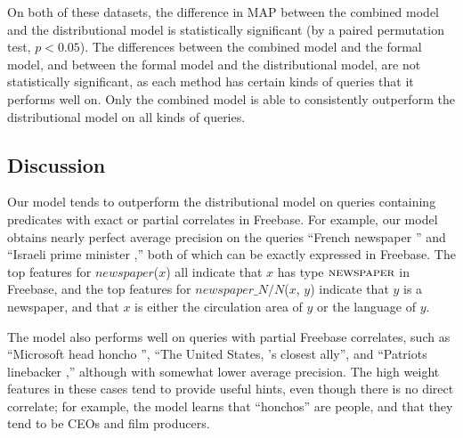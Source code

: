 \documentclass[11pt,letterpaper]{article}
\newcommand{\blank}{\underline{\hspace{.5cm}}}
\newcommand{\lexicalpredicate}[1]{\ensuremath{\textit{#1}}}
\newcommand{\formalpredicate}[1]{{\small \ensuremath{\textsc{#1}}}}
\begin{document}
On both of these datasets, the difference in MAP between the combined model and the distributional
model is statistically significant (by a paired permutation test, $p < 0.05$).  The differences
between the combined model and the formal model, and between the formal model and the
distributional model, are not statistically significant, as each method has certain kinds of
queries that it performs well on.  Only the combined model is able to consistently outperform the
distributional model on all kinds of queries.

\subsection{Discussion}

Our model tends to outperform the distributional model on queries containing predicates with exact
or partial correlates in Freebase. For example, our model obtains nearly perfect average precision
on the queries ``French newspaper \blank{}'' and ``Israeli prime minister \blank{},'' both of which
can be exactly expressed in Freebase.  The top features for \lexicalpredicate{newspaper}($x$) all
indicate that $x$ has type \formalpredicate{newspaper} in Freebase, and the top features for
\lexicalpredicate{newspaper\_N/N}($x$, $y$) indicate that $y$ is a newspaper, and that $x$ is
either the circulation area of $y$ or the language of $y$.

The model also performs well on queries with partial Freebase correlates, such as ``Microsoft head
honcho \blank{}'', ``The United States, \blank{}'s closest ally'', and ``Patriots linebacker
\blank{},'' although with somewhat lower average precision. The high weight features in these cases
tend to provide useful hints, even though there is no direct correlate; for example, the model
learns that ``honchos'' are people, and that they tend to be CEOs and film producers.
\end{document}
